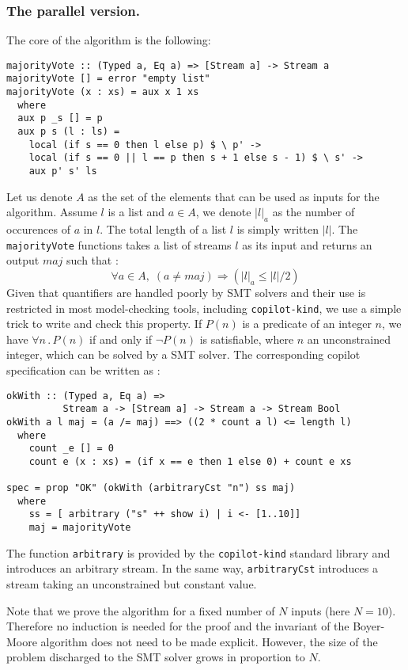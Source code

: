 \subsubsection{The parallel version.} The core of the algorithm is the
following:

\begin{lstlisting}[frame=single]
majorityVote :: (Typed a, Eq a) => [Stream a] -> Stream a
majorityVote [] = error "empty list"
majorityVote (x : xs) = aux x 1 xs
  where
  aux p _s [] = p
  aux p s (l : ls) =
    local (if s == 0 then l else p) $ \ p' ->
    local (if s == 0 || l == p then s + 1 else s - 1) $ \ s' ->
    aux p' s' ls
\end{lstlisting} 
Let us denote $A$ as the set of the elements that can be used as
inputs for the algorithm.  Assume $l$ is a list and $a \in A$, we
denote $|l|_a$ as the number of occurences of $a$ in $l$. The total
length of a list $l$ is simply written $|l|$. The
\texttt{majorityVote} functions takes a list of streams $l$ as its
input and returns an output $maj$ such that : \[ \forall a \in A, \;
\left( a \neq maj \right) \Longrightarrow \left(|l|_a \leq |l| /
  {2}\right) \] Given that quantifiers are handled poorly by SMT
solvers and their use is restricted in most model-checking tools,
including \texttt{copilot-kind}, we use a simple trick to write
and check this property.  If $P(n)$ is a predicate of an integer $n$,
we have $\forall n \, . \, P(n)$ if and only if $\neg P(n)$ is
satisfiable, where $n$ an unconstrained integer, which can be solved
by a SMT solver. The corresponding copilot specification can be
written as :
\begin{lstlisting}[frame=single]
okWith :: (Typed a, Eq a) => 
          Stream a -> [Stream a] -> Stream a -> Stream Bool
okWith a l maj = (a /= maj) ==> ((2 * count a l) <= length l)
  where
    count _e [] = 0
    count e (x : xs) = (if x == e then 1 else 0) + count e xs

spec = prop "OK" (okWith (arbitraryCst "n") ss maj)
  where
    ss = [ arbitrary ("s" ++ show i) | i <- [1..10]]
    maj = majorityVote
\end{lstlisting}
The function \texttt{arbitrary} is provided by the \texttt{copilot-kind} standard library and introduces an arbitrary stream. In the same way, \texttt{arbitraryCst} introduces a stream taking an unconstrained but constant value.

Note that we prove the algorithm for a fixed number of $N$ inputs
(here $N=10$). Therefore no induction is needed for the proof and the
invariant of the Boyer-Moore algorithm does not need to be made explicit. However, the size of the problem discharged to the SMT solver grows in proportion to $N$.


